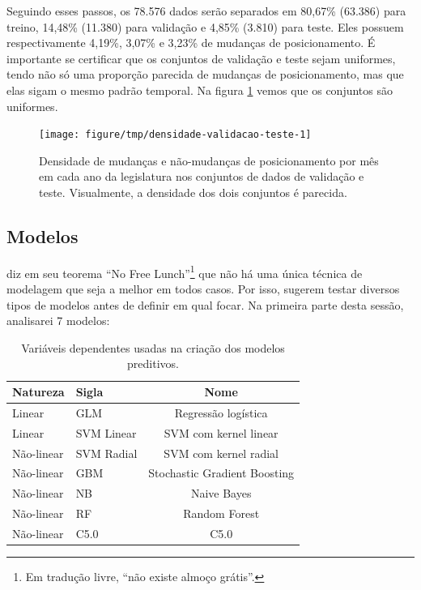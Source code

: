 \documentclass[a4paper,titlepage]{ppgi}\usepackage[]{graphicx}\usepackage[]{color}
\newenvironment{knitrout}{}{} %
\begin{document}
Seguindo esses passos, os 78.576 dados serão separados em
80,67\% (63.386)
para treino, 14,48\%
(11.380) para validação e 4,85\% (3.810) para teste. Eles possuem
respectivamente 4,19\%,
3,07\% e
3,23\% de mudanças de
posicionamento. É importante se certificar que os conjuntos de validação e
teste sejam uniformes, tendo não só uma proporção parecida de mudanças de
posicionamento, mas que elas sigam o mesmo padrão temporal. Na figura
\ref{fig:densidade-validacao-teste} vemos que os conjuntos são uniformes.

\begin{knitrout}
\color{fgcolor}\begin{figure}
\texttt{[image: figure/tmp/densidade-validacao-teste-1]} \caption[Densidade de mudanças e não-mudanças de posicionamento por mês em cada ano da legislatura nos conjuntos de dados de validação e teste]{Densidade de mudanças e não-mudanças de posicionamento por mês em cada ano da legislatura nos conjuntos de dados de validação e teste. Visualmente, a densidade dos dois conjuntos é parecida.}\label{fig:densidade-validacao-teste}
\end{figure}


\end{knitrout}

\subsection{Modelos}

 diz em seu teorema ``No Free Lunch''\footnote{Em
tradução livre, ``não existe almoço grátis''.} que não há uma única técnica de
modelagem que seja a melhor em todos casos. Por isso, 
sugerem testar diversos tipos de modelos antes de definir em qual focar. Na
primeira parte desta sessão, analisarei 7 modelos:

\begin{table}
\centering
\begin{tabular}{l l c}
  Natureza & Sigla & Nome \\
  \hline
  Linear & GLM & Regressão logística \\
  Linear & SVM Linear & SVM com kernel linear \\
  Não-linear & SVM Radial & SVM com kernel radial \\
  Não-linear & GBM & Stochastic Gradient Boosting \\
  Não-linear & NB & Naive Bayes \\
  Não-linear & RF & Random Forest\\
  Não-linear & C5.0 & C5.0 \\
\end{tabular}
\caption{Variáveis dependentes usadas na criação dos modelos preditivos.}
\label{table:tipos-de-modelos}
\end{table}
\end{document}
